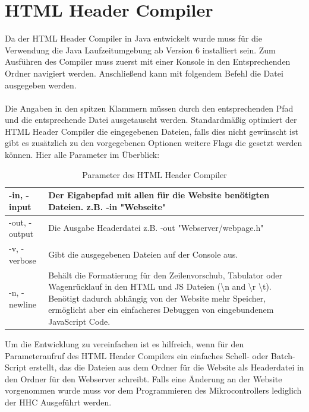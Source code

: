 \section{HTML Header Compiler}
\label{chap:benutzerhandbuch.HHC}

Da der HTML Header Compiler in Java entwickelt wurde muss für die Verwendung die
Java Laufzeitumgebung ab Version 6 installiert sein. Zum Ausführen des Compiler
muss zuerst mit einer Konsole in den Entsprechenden Ordner navigiert werden.
Anschließend kann mit folgendem Befehl die Datei ausgegeben werden. 
\\

\\

Die Angaben in den spitzen Klammern müssen durch den entsprechenden Pfad und
die entsprechende Datei ausgetauscht werden. Standardmäßig optimiert der
HTML Header Compiler die eingegebenen Dateien, falls dies nicht gewünscht ist
gibt es zusätzlich zu den vorgegebenen Optionen weitere Flags
die gesetzt werden können. Hier alle Parameter im Überblick:

\begin{table}[H]
\begin{tabular}{| p{} | p{} |}
\hline
-in, -input & Der Eigabepfad mit allen für die Website benötigten Dateien. z.B. \textrm{-in "Webseite"} \\ \hline 
-out, -output & Die Ausgabe Headerdatei z.B. \textrm{-out "Webserver/webpage.h"} \\ \hline
-v, -verbose &  Gibt die ausgegebenen Dateien auf der Console aus. \\  
 \hline 
 -n, -newline & Behält die Formatierung für den Zeilenvorschub, Tabulator
 oder Wagenrücklauf in den HTML und JS Dateien (\textbackslash n and
 \textbackslash r \textbackslash t).
 Benötigt dadurch abhängig von der Website mehr Speicher, ermöglicht aber ein
 einfacheres Debuggen von eingebundenem JavaScript Code.  \\ \hline
\end{tabular}
\caption{Parameter des HTML Header Compiler}
\label{parameterHHC}
\end{table}

Um die Entwicklung zu vereinfachen ist es hilfreich, wenn für den Parameteraufruf
des HTML Header Compilers ein einfaches Schell- oder Batch-Script erstellt, das
die Dateien aus dem Ordner für die Website als Headerdatei in den Ordner für den
Webserver schreibt. Falls eine Änderung an der Website vorgenommen wurde muss
vor dem Programmieren des Mikrocontrollers lediglich der \ac{HHC} Ausgeführt
werden.

